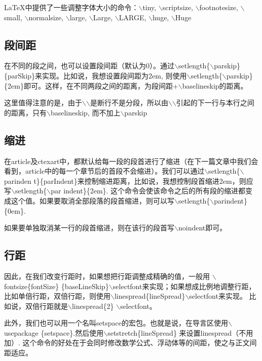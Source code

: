 \documentclass[12pt]{book}
\begin{document}
LaTeX中提供了一些调整字体大小的命令：$\backslash$tiny, $\backslash$scriptsize, $\backslash$footnotesize, $\backslash$small, $\backslash$normalsize, $\backslash$large, $\backslash$Large, $\backslash$LARGE, $\backslash$huge, $\backslash$Huge



\subsection{段间距}

在不同的段之间，也可以设置段间距（默认为0）。通过$\backslash$setlength\{$\backslash$parskip\}\{parSkip\}来实现。比如说，我想设置段间距为2em, 则使用$\backslash$setlength\{$\backslash$parskip\}\{2em\}即可。这样，在不同两段之间的距离，为段间距+$\backslash$baselineskip的距离。

这里值得注意的是，由于$\backslash$$\backslash$是断行不是分段，所以由$\backslash$$\backslash$引起的下一行与本行之间的距离，只有$\backslash$baselineskip, 而不加上$\backslash$parskip

\subsection{缩进}

在article及ctexart中，都默认给每一段的段首进行了缩进（在下一篇文章中我们会看到，article中的每一个章节后的首段不会缩进）。我们可以通过$\backslash$setlength\{$\backslash$parinden t\}\{parIndent\}来控制缩进距离，比如说，我想控制段首缩进2em，则应写$\backslash$setlength\{$\backslash$par indent\}\{2em\}. 这个命令会使该命令之后的所有段的缩进都变成这个值。如果要取消全部段落的段首缩进，则可以写$\backslash$setlength\{$\backslash$parindent\}\{0em\}.

如果要单独取消某一行的段首缩进，则在该行的段首写$\backslash$noindent即可。

\subsection{行距}

因此，在我们改变行距时，如果想把行距调整成精确的值，一般用 $\backslash$fontsize\{fontSize\} \{baseLineSkip\}$\backslash$selectfont来实现；如果想成比例地调整行距，比如单倍行距，双倍行距，则使用$\backslash$linespread\{lineSpread\}$\backslash$selectfont来实现。 比如说，双倍行距就是$\backslash$linespread\{2\} $\backslash$selectfont。

此外，我们也可以用一个名叫setspace的宏包。也就是说，在导言区使用$\backslash$usepackage \{setspace\}.然后使用$\backslash$setstretch\{lineSpread\} 来设置linespread（不用加\selectfont）. 这个命令的好处在于会同时修改数学公式、浮动体等的间距，使之与正文间距适应。
\end{document}
